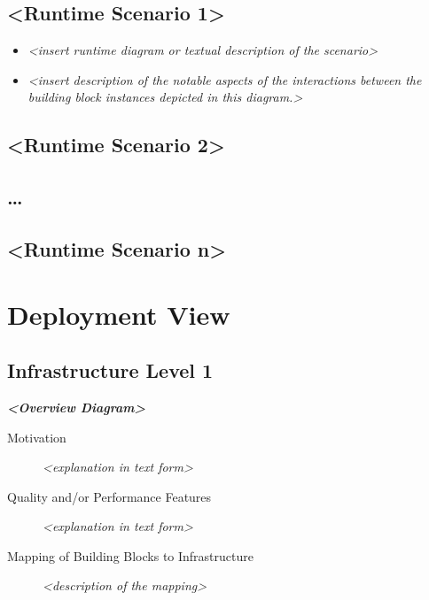 \subsection{\textless{}Runtime Scenario
1\textgreater{}}\label{__runtime_scenario_1}

\begin{itemize}
\item
  \emph{\textless{}insert runtime diagram or textual description of the
  scenario\textgreater{}}
\item
  \emph{\textless{}insert description of the notable aspects of the
  interactions between the building block instances depicted in this
  diagram.\textgreater{}}
\end{itemize}

\subsection{\textless{}Runtime Scenario
2\textgreater{}}\label{__runtime_scenario_2}

\subsection{\ldots{}}\label{_}

\subsection{\textless{}Runtime Scenario
n\textgreater{}}\label{__runtime_scenario_n}

\section{Deployment View}\label{section-deployment-view}

\subsection{Infrastructure Level 1}\label{_infrastructure_level_1}

\emph{\textbf{\textless{}Overview Diagram\textgreater{}}}

\begin{description}
\item[Motivation]
\emph{\textless{}explanation in text form\textgreater{}}
\item[Quality and/or Performance Features]
\emph{\textless{}explanation in text form\textgreater{}}
\item[Mapping of Building Blocks to Infrastructure]
\emph{\textless{}description of the mapping\textgreater{}}
\end{description}

